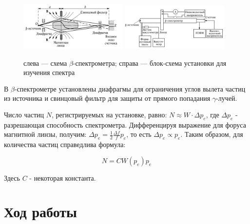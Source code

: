 \documentclass[a4paper, 12pt]{article}%
\begin{document}
	\begin{figure}[h]
	\centering
	\includegraphics[width=0.48\textwidth]{lab}
	\hfill
	\includegraphics[width=0.48\textwidth]{lab2}
	\caption{слева --- схема $\beta$-спектрометра; справа --- блок-схема установки для изучения спектра}
	\label{pic:scheme}
\end{figure}

В $\beta$-спектрометре установлены диафрагмы для ограничения углов вылета частиц из источника и свинцовый фильтр для защиты от прямого попадания $\gamma$-лучей. 

Число частиц $N$, регистрируемых на установке, равно: $N \approx W \cdot \Delta p_e$, где $\Delta p_e$ - разрешающая способность спектрометра. Дифференцируя выражение для форуса магнитной линзы, получим: $\Delta p_e = \frac{1}{2}\frac{\Delta f}{f}p_e$, то есть $\Delta p_e \propto p_e$. Таким образом, для количества частиц справедлива формула: 

\begin{equation}\label{N}
 N = CW(p_e)p_e 
\end{equation}

Здесь $C$ - некоторая константа.

\section{Ход работы}
\end{document}
